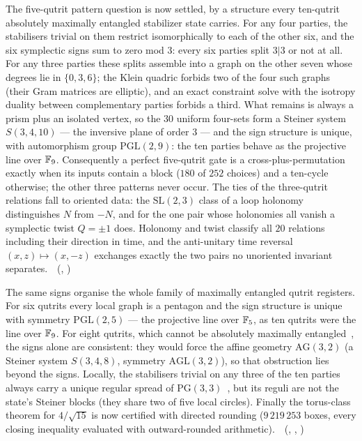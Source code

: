 The five-qutrit pattern question is now settled, by a structure every ten-qutrit absolutely maximally entangled
stabilizer state carries. For any four parties, the stabilisers trivial on them restrict isomorphically to each of
the other six, and the six symplectic signs sum to zero mod $3$: every six parties split $3|3$ or not at all. For any
three parties these splits assemble into a graph on the other seven whose degrees lie in $\{0,3,6\}$; the Klein
quadric forbids two of the four such graphs (their Gram matrices are elliptic), and an exact constraint solve with
the isotropy duality between complementary parties forbids a third. What remains is always a prism plus an isolated
vertex, so the $30$ uniform four-sets form a Steiner system $S(3,4,10)$ --- the inversive plane of order $3$ --- and
the sign structure is unique, with automorphism group $\mathrm{PGL}(2,9)$: the ten parties behave as the projective
line over $\mathbb{F}_9$. Consequently a perfect five-qutrit gate is a cross-plus-permutation exactly when its inputs contain
a block ($180$ of $252$ choices) and a ten-cycle otherwise; the other three patterns never occur. The ties of the
three-qutrit relations fall to oriented data: the $\mathrm{SL}(2,3)$ class of a loop holonomy distinguishes $N$ from
$-N$, and for the one pair whose holonomies all vanish a symplectic twist $Q=\pm1$ does. Holonomy and twist classify
all $20$ relations including their direction in time, and the anti-unitary time reversal $(x,z)\mapsto(x,-z)$
exchanges exactly the two pairs no unoriented invariant separates.
\tierT\,\tierC\ (, )

The same signs organise the whole family of maximally entangled qutrit registers. For six qutrits every local graph
is a pentagon and the sign structure is unique with symmetry $\mathrm{PGL}(2,5)$ --- the projective line over $\mathbb{F}_5$,
as ten qutrits were the line over $\mathbb{F}_9$. For eight qutrits, which cannot be absolutely maximally
entangled~\cite{HuberShadow2018}, the signs alone are consistent: they would force the affine geometry
$\mathrm{AG}(3,2)$ (a Steiner system $S(3,4,8)$, symmetry $\mathrm{AGL}(3,2)$), so that obstruction lies beyond
the signs. Locally, the stabilisers trivial on any three of the ten parties always carry a unique regular spread of
$\mathrm{PG}(3,3)$~\cite{Thas1997}, but its reguli are not the state's Steiner blocks (they share two of five local
circles). Finally the torus-class theorem for $4/\sqrt{15}$ is now certified with directed rounding ($9\,219\,253$
boxes, every closing inequality evaluated with outward-rounded arithmetic). \tierT\,\tierC\
(, ,
\cert{w33\_pass11203\_certified\_bnb.py})

